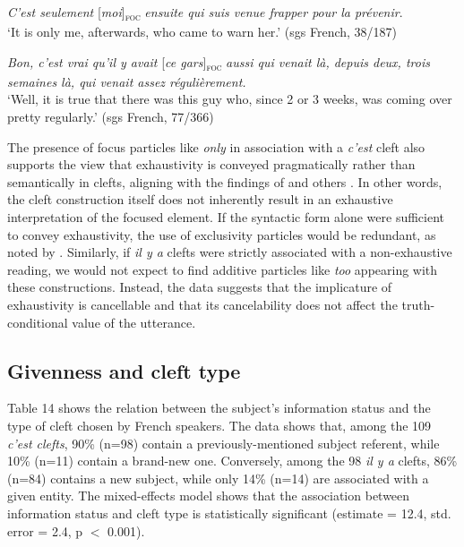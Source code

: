 \ea \label{ex:5:83}
 \textit{C'est seulement} {[\textit{moi}]\textsubscript{\textsc{foc}}} \normalsize \textit{ensuite qui suis venue frapper pour la prévenir}.\\
`It is only me, afterwards, who came to warn her.' \hfill (sgs French, 38/187)   
\z

\ea \label{ex:5:84}
\textit{Bon, c'est vrai qu'il y avait} {[\textit{ce gars}]\textsubscript{\textsc{foc}}} \normalsize \textit{aussi qui venait là, depuis deux, trois semaines là, qui venait assez régulièrement.}\\
`Well, it is true that there was this guy who, since 2 or 3 weeks, was coming over pretty regularly.' \hfill (sgs French, 77/366)    
\z


The presence of focus particles like \textit{only} in association with a \textit{c'est} cleft also supports the view that exhaustivity is conveyed pragmatically rather than semantically in clefts, aligning with the findings of \textcite{destruel2012french} and others \parencite{horn1981exhaustiveness, de2018experimental}. In other words, the cleft construction itself does not inherently result in an exhaustive interpretation of the focused element. If the syntactic form alone were sufficient to convey exhaustivity, the use of exclusivity particles would be redundant, as noted by \textcite{dufter2009clefting}. Similarly, if \textit{il y a} clefts were strictly associated with a non-exhaustive reading, we would not expect to find additive particles like \textit{too} appearing with these constructions. Instead, the data suggests that the implicature of exhaustivity is cancellable and that its cancelability does not affect the truth-conditional value of the utterance.


\subsection{Givenness and cleft type}

Table 14 shows the relation between the subject's information status and the type of cleft chosen by French speakers. The data shows that, among the 109 \textit{c'est clefts}, 90\% (n=98) contain a previously-mentioned subject referent, while 10\% (n=11) contain a brand-new one. Conversely, among the 98 \textit{il y a} clefts, 86\% (n=84) contains a new subject, while only 14\% (n=14) are associated with a given entity. The mixed-effects model shows that the association between information status and cleft type is statistically significant (estimate = 12.4, std. error = 2.4, p $<$ 0.001).

